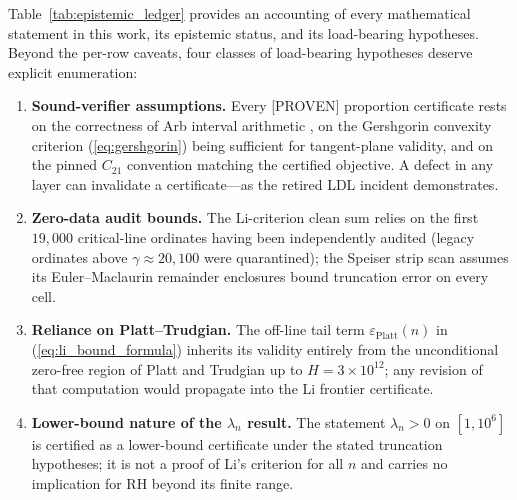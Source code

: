 \documentclass[11pt,a4paper]{article}
\theoremstyle{remark}
\newcommand{\eps}{\varepsilon}
\begin{document}
Table~\ref{tab:epistemic_ledger} provides an accounting of every mathematical statement in this work, its epistemic status, and its load-bearing hypotheses.
Beyond the per-row caveats, four classes of load-bearing hypotheses deserve explicit enumeration:
\begin{enumerate}
\item \textbf{Sound-verifier assumptions.} Every [PROVEN] proportion certificate rests on the correctness of Arb interval arithmetic \cite{johansson2017arb}, on the Gershgorin convexity criterion (\ref{eq:gershgorin}) being sufficient for tangent-plane validity, and on the pinned $C_{21}$ convention matching the certified objective. A defect in any layer can invalidate a certificate---as the retired LDL incident demonstrates.
\item \textbf{Zero-data audit bounds.} The Li-criterion clean sum relies on the first $19{,}000$ critical-line ordinates having been independently audited (legacy ordinates above $\gamma \approx 20{,}100$ were quarantined); the Speiser strip scan assumes its Euler--Maclaurin remainder enclosures bound truncation error on every cell.
\item \textbf{Reliance on Platt--Trudgian.} The off-line tail term $\eps_{\text{Platt}}(n)$ in (\ref{eq:li_bound_formula}) inherits its validity entirely from the unconditional zero-free region of Platt and Trudgian \cite{platt2021} up to $H = 3 \times 10^{12}$; any revision of that computation would propagate into the Li frontier certificate.
\item \textbf{Lower-bound nature of the $\lambda_n$ result.} The statement $\lambda_n > 0$ on $[1, 10^6]$ is certified as a lower-bound certificate under the stated truncation hypotheses; it is not a proof of Li's criterion for all $n$ and carries no implication for RH beyond its finite range.
\end{enumerate}
\end{document}
